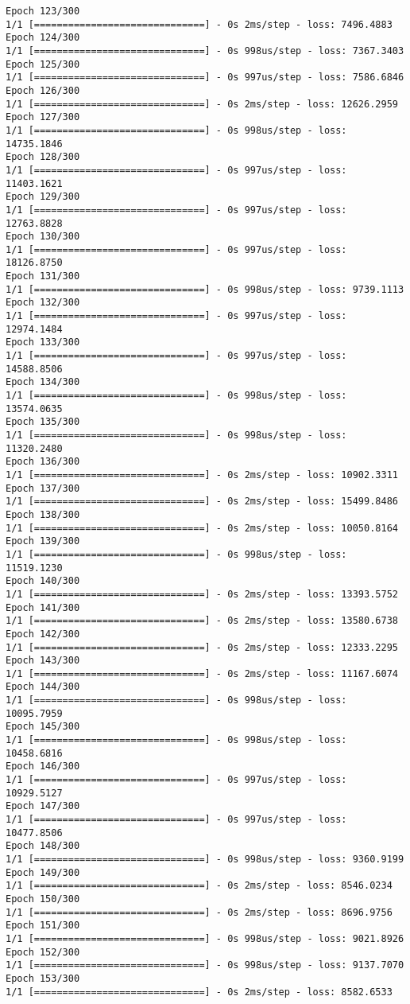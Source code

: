 \documentclass[11pt]{article}
\begin{document}
\begin{Verbatim}[commandchars=\\\{\}]
Epoch 123/300
1/1 [==============================] - 0s 2ms/step - loss: 7496.4883
Epoch 124/300
1/1 [==============================] - 0s 998us/step - loss: 7367.3403
Epoch 125/300
1/1 [==============================] - 0s 997us/step - loss: 7586.6846
Epoch 126/300
1/1 [==============================] - 0s 2ms/step - loss: 12626.2959
Epoch 127/300
1/1 [==============================] - 0s 998us/step - loss: 14735.1846
Epoch 128/300
1/1 [==============================] - 0s 997us/step - loss: 11403.1621
Epoch 129/300
1/1 [==============================] - 0s 997us/step - loss: 12763.8828
Epoch 130/300
1/1 [==============================] - 0s 997us/step - loss: 18126.8750
Epoch 131/300
1/1 [==============================] - 0s 998us/step - loss: 9739.1113
Epoch 132/300
1/1 [==============================] - 0s 997us/step - loss: 12974.1484
Epoch 133/300
1/1 [==============================] - 0s 997us/step - loss: 14588.8506
Epoch 134/300
1/1 [==============================] - 0s 998us/step - loss: 13574.0635
Epoch 135/300
1/1 [==============================] - 0s 998us/step - loss: 11320.2480
Epoch 136/300
1/1 [==============================] - 0s 2ms/step - loss: 10902.3311
Epoch 137/300
1/1 [==============================] - 0s 2ms/step - loss: 15499.8486
Epoch 138/300
1/1 [==============================] - 0s 2ms/step - loss: 10050.8164
Epoch 139/300
1/1 [==============================] - 0s 998us/step - loss: 11519.1230
Epoch 140/300
1/1 [==============================] - 0s 2ms/step - loss: 13393.5752
Epoch 141/300
1/1 [==============================] - 0s 2ms/step - loss: 13580.6738
Epoch 142/300
1/1 [==============================] - 0s 2ms/step - loss: 12333.2295
Epoch 143/300
1/1 [==============================] - 0s 2ms/step - loss: 11167.6074
Epoch 144/300
1/1 [==============================] - 0s 998us/step - loss: 10095.7959
Epoch 145/300
1/1 [==============================] - 0s 998us/step - loss: 10458.6816
Epoch 146/300
1/1 [==============================] - 0s 997us/step - loss: 10929.5127
Epoch 147/300
1/1 [==============================] - 0s 997us/step - loss: 10477.8506
Epoch 148/300
1/1 [==============================] - 0s 998us/step - loss: 9360.9199
Epoch 149/300
1/1 [==============================] - 0s 2ms/step - loss: 8546.0234
Epoch 150/300
1/1 [==============================] - 0s 2ms/step - loss: 8696.9756
Epoch 151/300
1/1 [==============================] - 0s 998us/step - loss: 9021.8926
Epoch 152/300
1/1 [==============================] - 0s 998us/step - loss: 9137.7070
Epoch 153/300
1/1 [==============================] - 0s 2ms/step - loss: 8582.6533

\end{Verbatim}
\end{document}
